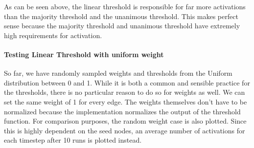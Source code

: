 \documentclass[11pt]{article}
\begin{document}
    As can be seen above, the linear threshold is responsible for far more
activations than the majority threshold and the unanimous threshold.
This makes perfect sense because the majority threshold and unanimous
threshold have extremely high requirements for activation.

    \hypertarget{testing-linear-threshold-with-uniform-weight}{%
\paragraph{Testing Linear Threshold with uniform
weight}\label{testing-linear-threshold-with-uniform-weight}}

So far, we have randomly sampled weights and thresholds from the Uniform
distribution between 0 and 1. While it is both a common and sensible
practice for the thresholds, there is no particular reason to do so for
weights as well. We can set the same weight of 1 for every edge. The
weights themselves don't have to be normalized because the
implementation normalizes the output of the threshold function. For
comparison purposes, the random weight case is also plotted. Since this
is highly dependent on the seed nodes, an average number of activations
for each timestep after 10 runs is plotted instead.
\end{document}
